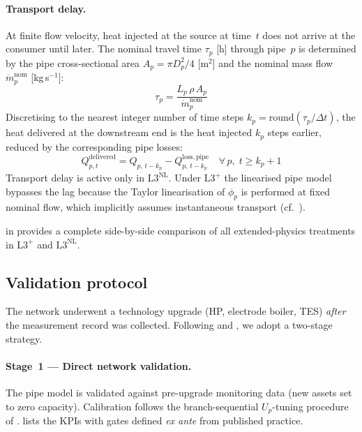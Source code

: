 \documentclass[a4paper,fleqn]{cas-dc}
\newcommand{\Lplus}{\mathrm{L3}^{+}}
\newcommand{\Lnl}{\mathrm{L3}^{\mathrm{NL}}}
\begin{document}
\paragraph{Transport delay.}
\label{sec:model_delay}
At finite flow velocity, heat injected at the source at time~$t$
does not arrive at the consumer until later. The nominal
travel time $\tau_p$ [h] through pipe~$p$ is determined by the
pipe cross-sectional area $A_p = \pi D_p^2/4$ [m$^2$] and
the nominal mass flow $\dot{m}_p^{\mathrm{nom}}$ [kg\,s$^{-1}$]:
%
\begin{equation}
  \tau_p = \frac{L_p\, \rho\, A_p}{\dot{m}_p^{\mathrm{nom}}}
  \label{eq:delay_time}
\end{equation}
%
Discretising to the nearest integer number of time steps
$k_p = \mathrm{round}(\tau_p / \Delta t)$, the heat delivered
at the downstream end is the heat injected $k_p$ steps earlier,
reduced by the corresponding pipe losses:
%
\begin{equation}
  Q_{p,t}^{\mathrm{delivered}} =
    Q_{p,\,t-k_p} - Q_{p,\,t-k_p}^{\mathrm{loss,pipe}}
  \quad \forall\, p,\; t \geq k_p{+}1
  \label{eq:delayed_balance}
\end{equation}
%
Transport delay is active only in $\Lnl$. Under $\Lplus$ the
linearised pipe model bypasses the lag because the Taylor
linearisation of $\phi_p$ is performed at fixed nominal flow,
which implicitly assumes instantaneous transport
(cf.\ ).

 in 
provides a complete side-by-side comparison of all extended-physics
treatments in $\Lplus$ and $\Lnl$.

\subsection{Validation protocol}
\label{sec:val_protocol}

The network underwent a technology upgrade (HP, electrode boiler,
TES) \emph{after} the measurement record was collected. Following
\citet{Kus2025} and \citet{Maldonado2024}, we adopt a two-stage
strategy.

\paragraph{Stage~1 --- Direct network validation.}
The pipe model is validated against pre-upgrade monitoring data
(new assets set to zero capacity). Calibration follows the
branch-sequential $U_p$-tuning procedure of
\citet{Maldonado2024}.  lists the KPIs with
gates defined \emph{ex ante} from published practice.
\end{document}
